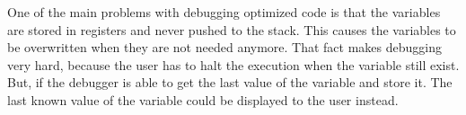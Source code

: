 One of the main problems with debugging optimized code is that the variables are stored in registers and never pushed to the stack.
This causes the variables to be overwritten when they are not needed anymore.
That fact makes debugging very hard, because the user has to halt the execution when the variable still exist.
But, if the debugger is able to get the last value of the variable and store it.
The last known value of the variable could be displayed to the user instead.




